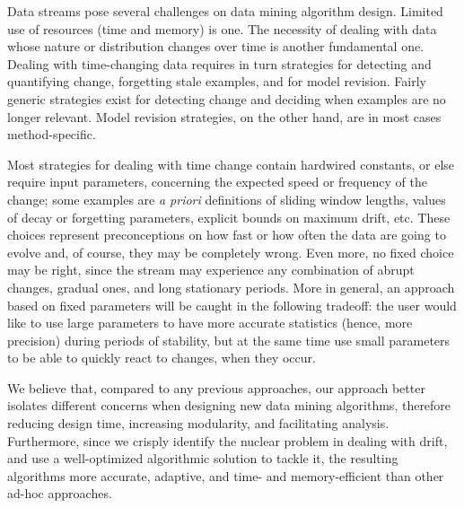 



\BEGINOMIT
Data streams pose several challenges on data mining algorithm design. 
Limited use of resources (time and memory) is one. The necessity of dealing
with data whose nature or distribution changes over time is another
fundamental one. Dealing with time-changing data requires in turn 
strategies for detecting and quantifying change, forgetting stale examples, 
and for model revision. Fairly generic strategies exist for detecting
change and deciding when examples are no longer relevant. Model revision
strategies, on the other hand, are in most cases method-specific.

Most strategies for dealing with time change contain hardwired constants, 
or else require input parameters, concerning the expected speed or frequency 
of the change; some examples are {\em a priori} definitions of sliding window
lengths, values of decay or forgetting parameters, explicit bounds on maximum drift, etc. 
These choices represent preconceptions 
on how fast or how often the data are going to evolve and, of course, they 
may be completely wrong. Even more, no fixed 
choice may be right, since the stream may experience any combination 
of abrupt changes, gradual ones, and long stationary periods. 
More in general, an approach based on fixed parameters will be caught in the following tradeoff: 
the user would like to use large parameters to have more accurate statistics 
(hence, more precision) during periods of stability, but at the same time use small parameters 
to be able to quickly react to changes, when they occur. 

We believe that, compared to any previous approaches, our approach better isolates different
concerns when designing new data mining algorithms, therefore reducing design time,
increasing modularity, and facilitating analysis. Furthermore, since we crisply identify
the nuclear problem in dealing with drift, and use a well-optimized algorithmic solution to tackle it,
the resulting algorithms more accurate, adaptive, and time- and memory-efficient than other
ad-hoc approaches. %


